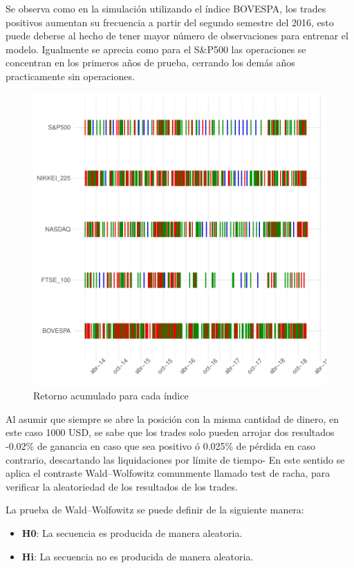 \documentclass[a4paper,12pt]{Latex/Classes/PhDthesisPSnPDF}
\begin{document}
Se observa como en la simulación utilizando el índice BOVESPA, los trades positivos aumentan su frecuencia a partir del segundo semestre del 2016, esto puede deberse al hecho de tener mayor número de observaciones para entrenar el modelo. Igualmente se aprecia como para el S\&P500 las operaciones se concentran en los primeros años de prueba, cerrando los demás años practicamente sin operaciones.


\begin{figure}[H]
\centering
\includegraphics{main-030}
\caption{Retorno acumulado para cada índice}
\end{figure}

Al asumir que siempre se abre la posición con la misma cantidad de dinero, en este caso 1000 USD, se sabe que los trades solo pueden arrojar dos resultados -0.02\% de ganancia en caso que sea positivo ó 0.025\% de pérdida en caso contrario, descartando las liquidaciones por límite de tiempo- En este sentido se aplica el contraste Wald–Wolfowitz comunmente llamado test de racha, para verificar la aleatoriedad de los resultados de los trades.

La prueba de Wald–Wolfowitz se puede definir de la siguiente manera:

\begin{itemize}
\item \textbf{H0}: La secuencia es producida de manera aleatoria.
\item \textbf{Hi}: La secuencia no es producida de manera aleatoria.
\end{itemize}
\end{document}
